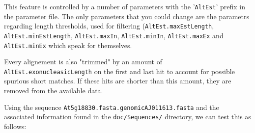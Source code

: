 \documentclass[a4paper,titlepage]{report}
\begin{document}
This feature is controlled by a number of parameters with the '\texttt{AltEst}'
prefix in the parameter file. The only parameters that you could change are the
parametrs regarding length thresholds, used for filtering (\texttt{AltEst.maxEstLength}, \texttt{AltEst.minEstLength}, \texttt{AltEst.maxIn}, \texttt{AltEst.minIn}, \texttt{AltEst.maxEx} and \texttt{AltEst.minEx} which speak for themselves.

Every alignement is also "trimmed" by an amount of \texttt{AltEst.exonucleasicLength} on the first and last hit to account for possible spurious short matches. If these hits are shorter than this amount, they are removed from the available data.

Using the sequence \texttt{At5g18830.fasta.genomicAJ011613.fasta} and the associated information found in
the \texttt{doc/Sequences/} directory, we can test this as follows:
\end{document}
